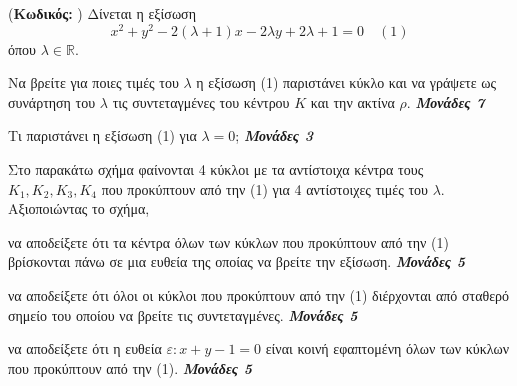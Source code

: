 \documentclass[11pt,a4paper,twoside]{book}
\newcounter{askhsh}[chapter]
\renewcommand{\theaskhsh}{
	\bf{\titlefont{\Large{\thechapter}}.\arabic{askhsh}}
}
\newcommand{\Askhsh}[2]{\refstepcounter{askhsh}{\vspace{4mm}\titlefont{{\large Άσκηση}\theaskhsh} - \textcolor{maincolor}{ΘEMA #2}} ({\small{\textbf{Κωδικός:} #1}})}{}
\newcommand{\monades}[1]{
\hspace*{\fill}
\textbf{\textit{\textcolor{maincolor}{Μονάδες #1}}}}
\begin{document}
\vspace{4mm}

\Askhsh{}{4}
Δίνεται η εξίσωση
\[ x^2 + y^2 -2(\lambda+1)x-2\lambda y+2\lambda+1=0 \quad (1) \]
όπου $\lambda \in \mathbb{R}$.

\begin{alist}    \item Να βρείτε για ποιες τιμές του $\lambda$ η εξίσωση (1) παριστάνει κύκλο και να γράψετε ως συνάρτηση του $\lambda$ τις συντεταγμένες του κέντρου $K$ και την ακτίνα $\rho$. \monades{7}
    \item Τι παριστάνει η εξίσωση (1) για $\lambda=0$; \monades{3}
    \item Στο παρακάτω σχήμα φαίνονται 4 κύκλοι με τα αντίστοιχα κέντρα τους $K_1, K_2, K_3, K_4$ που προκύπτουν από την (1) για 4 αντίστοιχες τιμές του $\lambda$. Αξιοποιώντας το σχήμα,
    \begin{rlist}
        \item να αποδείξετε ότι τα κέντρα όλων των κύκλων που προκύπτουν από την (1) βρίσκονται πάνω σε μια ευθεία της οποίας να βρείτε την εξίσωση. \monades{5}

        \item να αποδείξετε ότι όλοι οι κύκλοι που προκύπτουν από την (1) διέρχονται από σταθερό σημείο του οποίου να βρείτε τις συντεταγμένες. \monades{5}

        \item να αποδείξετε ότι η ευθεία $\varepsilon: x+y-1=0$ είναι κοινή εφαπτομένη όλων των κύκλων που προκύπτουν από την (1). \monades{5}
    \end{rlist}\end{alist}

\begin{center}
\end{center}
\end{document}
